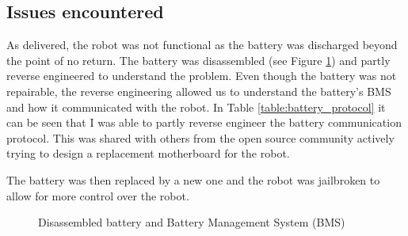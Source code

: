 \documentclass[11pt]{article}
\begin{document}
    \subsection{Issues encountered}
        \label{section:go2_battery}
        As delivered, the robot was not functional as the battery was discharged beyond the point of no return. The battery was disassembled (see Figure \ref{fig:disassembled_battery}) and partly reverse engineered to understand the problem. Even though the battery was not repairable, the reverse engineering allowed us to understand the battery's BMS and how it communicated with the robot. In Table \ref{table:battery_protocol} it can be seen that I was able to partly reverse engineer the battery communication protocol. This was shared with others from the open source community actively trying to design a replacement motherboard for the robot. 
        
        The battery was then replaced by a new one and the robot was jailbroken to allow for more control over the robot.
        

        \begin{figure}[h]
            \centering
            \caption{Disassembled battery and Battery Management System (BMS)}
            \label{fig:disassembled_battery}
        \end{figure}
\end{document}
